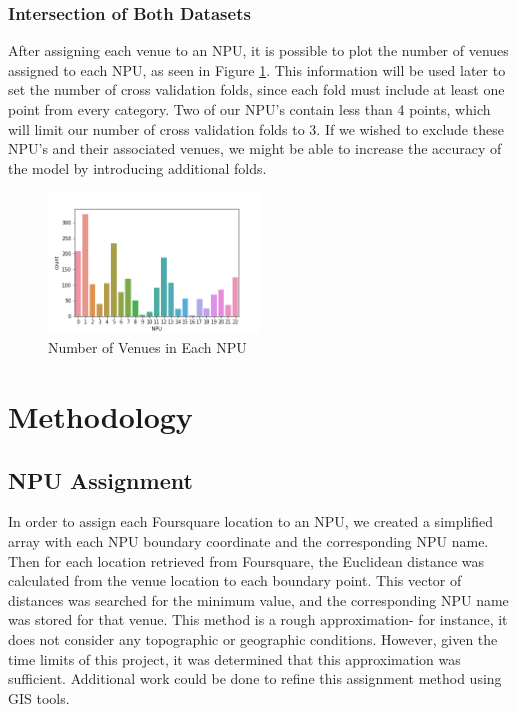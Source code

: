 \documentclass[11pt]{amsart}
\begin{document}
\subsubsection{Intersection of Both Datasets}
After assigning each venue to an NPU, it is possible to plot the number of venues assigned to each NPU, as seen in Figure \ref{fig:npucounts}. This information will be used later to set the number of cross validation folds, since each fold must include at least one point from every category. Two of our NPU's contain less than 4 points, which will limit our number of cross validation folds to 3. If we wished to exclude these NPU's and their associated venues, we might be able to increase the accuracy of the model by introducing additional folds. 

\begin{figure}
\includegraphics[width=0.5\textwidth]{NPUcounts}
\caption{Number of Venues in Each NPU}
\label{fig:npucounts}
\end{figure}
\FloatBarrier
\section{Methodology}
\subsection{NPU Assignment}
In order to assign each Foursquare location to an NPU, we created a simplified array with each NPU boundary coordinate and the corresponding NPU name. Then for each location retrieved from Foursquare, the Euclidean distance was calculated from the venue location to each boundary point. This vector of distances was searched for the minimum value, and the corresponding NPU name was stored for that venue. 
This method is a rough approximation- for instance, it does not consider any topographic or geographic conditions. However, given the time limits of this project, it was determined that this approximation was sufficient. Additional work could be done to refine this assignment method using GIS tools.
\end{document}

